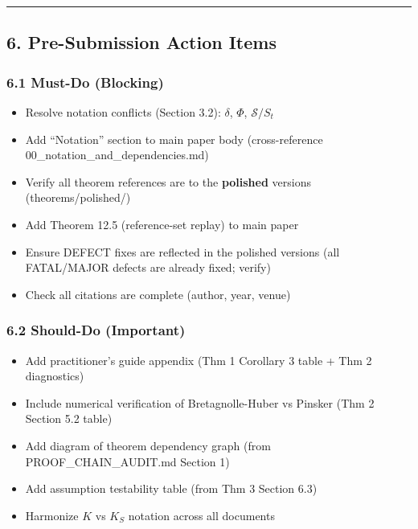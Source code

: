 \documentclass[
  12pt,
]{ctexart}
\providecommand{\tightlist}{%
  \setlength{\itemsep}{0pt}\setlength{\parskip}{0pt}}
\begin{document}
\begin{center}\rule{0.5\linewidth}{0.5pt}\end{center}

\subsection{6. Pre-Submission Action
Items}\label{pre-submission-action-items}

\subsubsection{6.1 Must-Do (Blocking)}\label{must-do-blocking}

\begin{itemize}
\tightlist
\item[$\square$]
  Resolve notation conflicts (Section 3.2): \(\delta\), \(\Phi\),
  \(\mathcal{S}/S_t\)
\item[$\square$]
  Add ``Notation'' section to main paper body (cross-reference
  00\_notation\_and\_dependencies.md)
\item[$\square$]
  Verify all theorem references are to the \textbf{polished} versions
  (theorems/polished/)
\item[$\square$]
  Add Theorem 12.5 (reference-set replay) to main paper
\item[$\square$]
  Ensure DEFECT fixes are reflected in the polished versions (all
  FATAL/MAJOR defects are already fixed; verify)
\item[$\square$]
  Check all citations are complete (author, year, venue)
\end{itemize}

\subsubsection{6.2 Should-Do (Important)}\label{should-do-important}

\begin{itemize}
\tightlist
\item[$\square$]
  Add practitioner's guide appendix (Thm 1 Corollary 3 table + Thm 2
  diagnostics)
\item[$\square$]
  Include numerical verification of Bretagnolle-Huber vs Pinsker (Thm 2
  Section 5.2 table)
\item[$\square$]
  Add diagram of theorem dependency graph (from PROOF\_CHAIN\_AUDIT.md
  Section 1)
\item[$\square$]
  Add assumption testability table (from Thm 3 Section 6.3)
\item[$\square$]
  Harmonize \(K\) vs \(K_S\) notation across all documents
\end{itemize}
\end{document}
